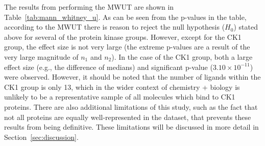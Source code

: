 \documentclass[11pt]{article}
\begin{document}
The results from performing the MWUT are shown in Table~\ref{tab:mann_whitney_u}. 
As can be seen from the p-values in the table, according to the MWUT there is reason to reject the null hypothesis ($H_0$) stated above for several of the protein kinase groups. 
However, except for the CK1 group, the effect size is not very large (the extreme p-values are a result of the very large magnitude of $n_1$ and $n_2$). 
In the case of the CK1 group, both a large effect size (e.g., the difference of medians) and significant p-value ($3.10 \times 10^{-11}$) were observed. 
However, it should be noted that the number of ligands within the CK1 group is only 13, which in the wider context of chemistry + biology is unlikely to be a representative sample of all molecules which bind to CK1 proteins. 
There are also additional limitations of this study, such as the fact that not all proteins are equally well-represented in the dataset, that prevents these results from being definitive. 
These limitations will be discussed in more detail in Section~\ref{sec:discussion}. 
\end{document}
